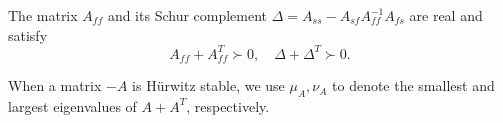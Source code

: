 \begin{assumption}\label{assumption:structure}\label{assumption:first}
    The matrix $A_{ff}$ and its Schur complement $\Delta = A_{ss} - A_{sf} A_{ff}^{-1} A_{fs}$ are real and satisfy 
    \begin{equation}
        A_{ff} + A_{ff}^T \succ 0, \quad \Delta + \Delta^T \succ 0 .
    \end{equation}
\end{assumption}
When a matrix $-A$ is H\"{u}rwitz stable, we use $\mu_A, \nu_A$ to denote the smallest and largest eigenvalues of $A + A^T$, respectively.







